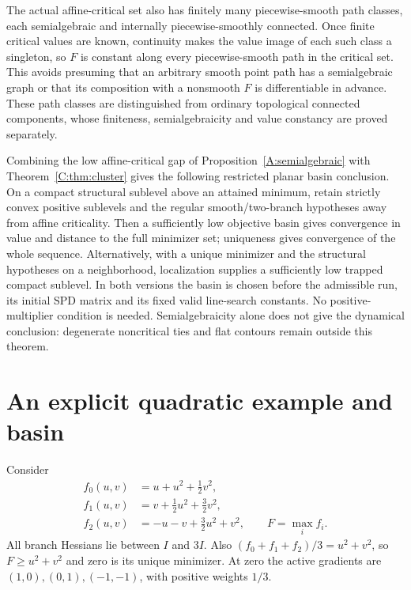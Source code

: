 The actual affine-critical set also has finitely many piecewise-smooth path classes, each semialgebraic and internally piecewise-smoothly connected. Once finite critical values are known, continuity makes the value image of each such class a singleton, so $F$ is constant along every piecewise-smooth path in the critical set. This avoids presuming that an arbitrary smooth point path has a semialgebraic graph or that its composition with a nonsmooth $F$ is differentiable in advance. These path classes are distinguished from ordinary topological connected components, whose finiteness, semialgebraicity and value constancy are proved separately.

Combining the low affine-critical gap of Proposition~\ref{A:semialgebraic} with Theorem~\ref{C:thm:cluster} gives the following restricted planar basin conclusion. On a compact structural sublevel above an attained minimum, retain strictly convex positive sublevels and the regular smooth/two-branch hypotheses away from affine criticality. Then a sufficiently low objective basin gives convergence in value and distance to the full minimizer set; uniqueness gives convergence of the whole sequence. Alternatively, with a unique minimizer and the structural hypotheses on a neighborhood, localization supplies a sufficiently low trapped compact sublevel. In both versions the basin is chosen before the admissible run, its initial SPD matrix and its fixed valid line-search constants. No positive-multiplier condition is needed. Semialgebraicity alone does not give the dynamical conclusion: degenerate noncritical ties and flat contours remain outside this theorem.


\setcounter{section}{7}
\setcounter{theorem}{7}
\setcounter{equation}{16}


\section{An explicit quadratic example and basin}

Consider
\[\begin{aligned}
 f_0(u,v)&=u+u^2+\tfrac12v^2,\\
 f_1(u,v)&=v+\tfrac12u^2+\tfrac32v^2,\\
 f_2(u,v)&=-u-v+\tfrac32u^2+v^2,\qquad F=\max_i f_i.
\end{aligned}\]
All branch Hessians lie between $I$ and $3I$. Also $(f_0+f_1+f_2)/3=u^2+v^2$, so $F\ge u^2+v^2$ and zero is its unique minimizer. At zero the active gradients are $(1,0),(0,1),(-1,-1)$, with positive weights $1/3$.

